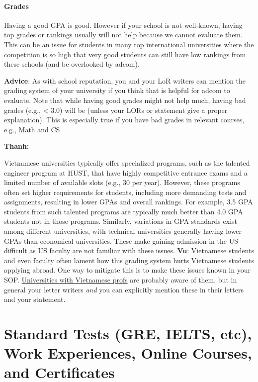\documentclass[oneside,11pt,dvipsnames]{book}
\newenvironment{commentbox}[1][]{
  \small
  \begin{mybox}
    {\small \textbf{#1}}
  }{
  \end{mybox}
}
\newcommand{\red}[1]{{\color{red}{#1}}}
\begin{document}
\paragraph{Grades} Having a good GPA is good. However if your school is not well-known, having top grades or rankings
usually will not help because we cannot evaluate them.  This can be an issue for students in many top international universities where the competition is so high that very good students can still have low rankings from these schools (and be overlooked by adcom).

\textbf{Advice}: As with school reputation, you and your LoR writers can mention the grading system of your university if you think that is helpful for adcom to evaluate.
Note that while having good grades might not help much,
having bad grades (e.g., < 3.0) will be \red{red flag} (unless your LORs or
statement give a proper explanation). This is especially true if you
have bad grades in relevant courses, e.g., Math and CS.

\begin{commentbox}[Thanh:]
  Vietnamese universities typically offer specialized programs, such as the talented engineer program at HUST, that have highly competitive entrance exams and a limited number of available slots (e.g., 30 per year). However, these programs often set higher requirements for students, including more demanding tests and assignments, resulting in lower GPAs and overall rankings. For example, 3.5 GPA students from such talented programs are typically much better than 4.0 GPA students not in those programs.  Similarly, variations in GPA standards exist among different universities, with technical universities generally having lower GPAs than economical universities. These make gaining admission in the US difficult as US faculty are not familiar with these issues.
  \tcblower
  \textbf{Vu}: Vietnamese students and even faculty often lament how this grading system hurts Vietnamese students applying abroad. One way to mitigate this is to make these issues known in your SOP.  \href{https://github.com/dynaroars/dynaroars.github.io/wiki/Viet-CS-Profs-US}{Universities with Vietnamese profs} are probably aware of them, but in general your letter writers \emph{and} you can explicitly mention these in their letters and your statement.
\end{commentbox}

\section{Standard Tests (GRE, IELTS, etc), Work Experiences, Online Courses, and Certificates}\label{sec:standard-tests}
\end{document}
